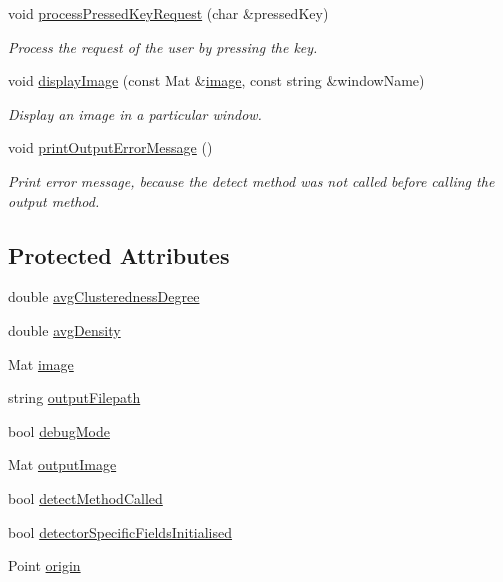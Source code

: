 \begin{DoxyCompactItemize}
void \hyperlink{classmultiscale_1_1analysis_1_1Detector_a72265d36d3fa22aa3c141eb4001fe2fe}{process\-Pressed\-Key\-Request} (char \&pressed\-Key)
\begin{DoxyCompactList}\small\item\em Process the request of the user by pressing the key. \end{DoxyCompactList}\item 
void \hyperlink{classmultiscale_1_1analysis_1_1Detector_ae68f8f87cc1e4e1cd22cee1e3604ef4b}{display\-Image} (const Mat \&\hyperlink{classmultiscale_1_1analysis_1_1Detector_a523830a6cfe409694ce8327c3c736fbd}{image}, const string \&window\-Name)
\begin{DoxyCompactList}\small\item\em Display an image in a particular window. \end{DoxyCompactList}\item 
void \hyperlink{classmultiscale_1_1analysis_1_1Detector_a9150f3fc7945405da34761a4250b7c79}{print\-Output\-Error\-Message} ()
\begin{DoxyCompactList}\small\item\em Print error message, because the detect method was not called before calling the output method. \end{DoxyCompactList}\end{DoxyCompactItemize}
\subsection*{Protected Attributes}
\begin{DoxyCompactItemize}
\item 
double \hyperlink{classmultiscale_1_1analysis_1_1Detector_a6d06607ae468a56e48f8daba0a00df5b}{avg\-Clusteredness\-Degree}
\item 
double \hyperlink{classmultiscale_1_1analysis_1_1Detector_a411629d4cf34809127662d625ba057c0}{avg\-Density}
\item 
Mat \hyperlink{classmultiscale_1_1analysis_1_1Detector_a523830a6cfe409694ce8327c3c736fbd}{image}
\item 
string \hyperlink{classmultiscale_1_1analysis_1_1Detector_a1a83df16d8afd347c0e1c9ddc41c9bee}{output\-Filepath}
\item 
bool \hyperlink{classmultiscale_1_1analysis_1_1Detector_a4b42f796957efd6ee0b8cf7645494a65}{debug\-Mode}
\item 
Mat \hyperlink{classmultiscale_1_1analysis_1_1Detector_a144e080a3af03c9bf3d8a80315823c86}{output\-Image}
\item 
bool \hyperlink{classmultiscale_1_1analysis_1_1Detector_ad565f471d9d7db7692da588ff0d6be2f}{detect\-Method\-Called}
\item 
bool \hyperlink{classmultiscale_1_1analysis_1_1Detector_a172b91067670a14a7707f24dc218f2af}{detector\-Specific\-Fields\-Initialised}
\item 
Point \hyperlink{classmultiscale_1_1analysis_1_1Detector_a002237e2ad684975a7c8b1e12dd7d780}{origin}
\end{DoxyCompactItemize}
